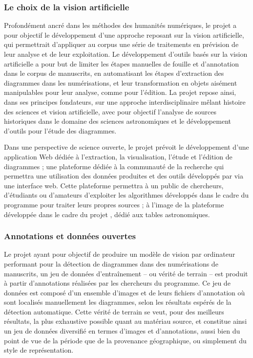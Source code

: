        \subsubsection{Le choix de la vision artificielle}
Profondément ancré dans les méthodes des humanités numériques, le projet \eida a pour objectif le développement d’une approche reposant sur la vision artificielle, qui permettrait d’appliquer au corpus une série de traitements en prévision de leur analyse et de leur exploitation. Le développement d’outils basés sur la vision artificielle a pour but de limiter les étapes manuelles de fouille et d’annotation dans le corpus de manuscrits, en automatisant les étapes d’extraction des diagrammes dans les numérisations, et leur transformation en objets aisément manipulables pour leur analyse, comme pour l’édition. La projet \eida repose ainsi, dans ses principes fondateurs, sur une approche interdisciplinaire mêlant histoire des sciences et vision artificielle, avec pour objectif l’analyse de sources historiques dans le domaine des sciences astronomiques et le développement d’outils pour l’étude des diagrammes.

Dans une perspective de science ouverte, le projet \eida prévoit le développement d’une application Web dédiée à l’extraction, la visualisation, l’étude et l’édition de diagrammes ; une plateforme dédiée à la communauté de la recherche qui permettra une utilisation des données produites et des outils développés par \eida via une interface web. Cette plateforme permettra à un public de chercheurs, d’étudiants ou d’amateurs d’exploiter les algorithmes développés dans le cadre du programme pour traiter leurs propres sources ; à l'image de la plateforme développée dans le cadre du projet \dishas, dédié aux tables astronomiques. 

        \subsubsection{Annotations et données ouvertes}
Le projet \eida ayant pour objectif de produire un modèle de vision par ordinateur performant pour la détection de diagrammes dans des numérisations de manuscrits, un jeu de données d'entraînement -- ou vérité de terrain -- est produit à partir d'annotations réalisées par les chercheurs du programme. Ce jeu de données est composé d'un ensemble d'images et de leurs fichiers d'annotation où sont localisés manuellement les diagrammes, selon les résultats espérés de la détection automatique. Cette vérité de terrain se veut, pour des meilleurs résultats, la plus exhaustive possible quant au matériau source, et constitue ainsi un jeu de données diversifié en termes d'images et d'annotations, aussi bien du point de vue de la période que de la provenance géographique, ou simplement du style de représentation. 

